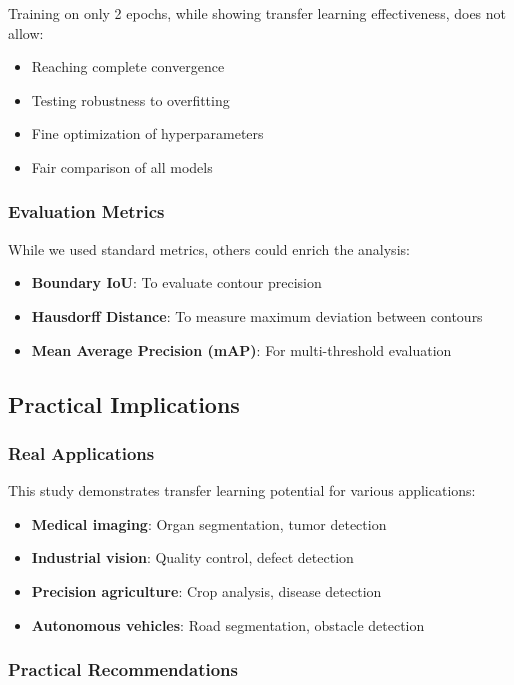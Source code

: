 \documentclass[12pt,a4paper]{article}
\begin{document}
Training on only 2 epochs, while showing transfer learning effectiveness, does not allow:
\begin{itemize}
    \item Reaching complete convergence
    \item Testing robustness to overfitting
    \item Fine optimization of hyperparameters
    \item Fair comparison of all models
\end{itemize}

\subsubsection{Evaluation Metrics}

While we used standard metrics, others could enrich the analysis:
\begin{itemize}
    \item \textbf{Boundary IoU}: To evaluate contour precision
    \item \textbf{Hausdorff Distance}: To measure maximum deviation between contours
    \item \textbf{Mean Average Precision (mAP)}: For multi-threshold evaluation
\end{itemize}

\subsection{Practical Implications}

\subsubsection{Real Applications}

This study demonstrates transfer learning potential for various applications:
\begin{itemize}
    \item \textbf{Medical imaging}: Organ segmentation, tumor detection
    \item \textbf{Industrial vision}: Quality control, defect detection
    \item \textbf{Precision agriculture}: Crop analysis, disease detection
    \item \textbf{Autonomous vehicles}: Road segmentation, obstacle detection
\end{itemize}

\subsubsection{Practical Recommendations}
\end{document}

